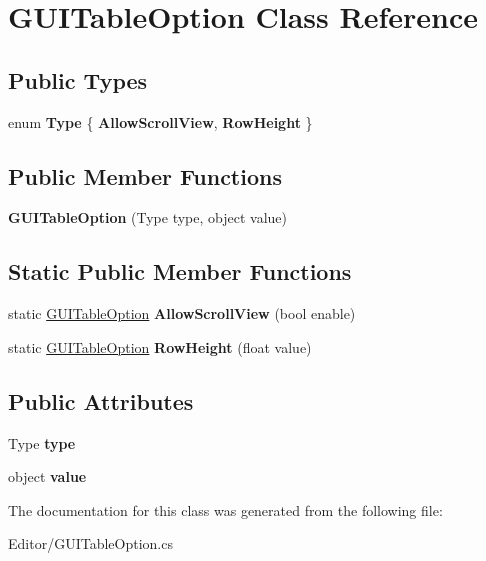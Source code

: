 \hypertarget{class_g_u_i_table_option}{}\section{G\+U\+I\+Table\+Option Class Reference}
\label{class_g_u_i_table_option}
\subsection*{Public Types}
\begin{DoxyCompactItemize}
\item 
\mbox{\label{class_g_u_i_table_option_a25ab7d318eb9f3e3387c472a563fe064}} 
enum {\bfseries Type} \{ {\bfseries Allow\+Scroll\+View}, 
{\bfseries Row\+Height}
 \}
\end{DoxyCompactItemize}
\subsection*{Public Member Functions}
\begin{DoxyCompactItemize}
\item 
\mbox{\label{class_g_u_i_table_option_a0994aae40f3768be90f6a287a26f4375}} 
{\bfseries G\+U\+I\+Table\+Option} (Type type, object value)
\end{DoxyCompactItemize}
\subsection*{Static Public Member Functions}
\begin{DoxyCompactItemize}
\item 
\mbox{\label{class_g_u_i_table_option_a217163e77d777976e86f625bb4a19dca}} 
static \mbox{\hyperlink{class_g_u_i_table_option}{G\+U\+I\+Table\+Option}} {\bfseries Allow\+Scroll\+View} (bool enable)
\item 
\mbox{\label{class_g_u_i_table_option_aa63ab7091049d036600b947b5390b99f}} 
static \mbox{\hyperlink{class_g_u_i_table_option}{G\+U\+I\+Table\+Option}} {\bfseries Row\+Height} (float value)
\end{DoxyCompactItemize}
\subsection*{Public Attributes}
\begin{DoxyCompactItemize}
\item 
\mbox{\label{class_g_u_i_table_option_a08bb01af3e9a0c5b64058af7d44ce8ae}} 
Type {\bfseries type}
\item 
\mbox{\label{class_g_u_i_table_option_a1dbfaf532e2cf813576280fc7859d676}} 
object {\bfseries value}
\end{DoxyCompactItemize}


The documentation for this class was generated from the following file\+:\begin{DoxyCompactItemize}
\item 
Editor/G\+U\+I\+Table\+Option.\+cs\end{DoxyCompactItemize}
